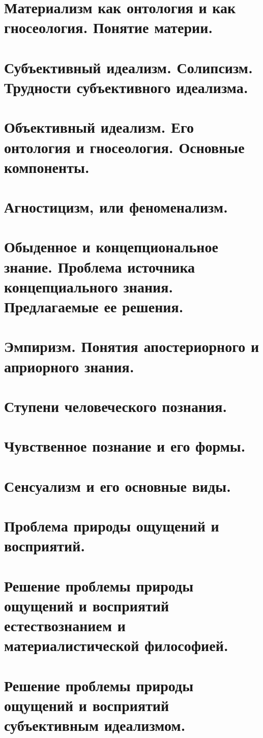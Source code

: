 \section{ Материализм как онтология и как гносеология. Понятие материи.}
\section{ Субъективный идеализм. Солипсизм. Трудности субъективного идеализма.}
\section{ Объективный идеализм. Его онтология и гносеология. Основные компоненты.}
\section{ Агностицизм, или феноменализм.}
\section{ Обыденное и концепциональное знание. Проблема источника концепциального знания. Предлагаемые ее решения.}
\section{ Эмпиризм. Понятия апостериорного и априорного знания.}
\section{ Ступени человеческого познания.}
\section{ Чувственное познание и его формы.}
\section{ Сенсуализм и его основные виды.}
\section{ Проблема природы ощущений и восприятий.}
\section{ Решение проблемы природы ощущений и восприятий естествознанием и материалистической философией.}
\section{ Решение проблемы природы ощущений и восприятий субъективным идеализмом.}
